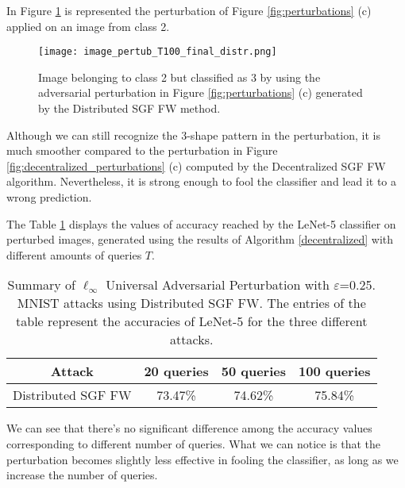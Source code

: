 In Figure \ref{fig:distributed} is represented the perturbation of Figure \ref{fig:perturbations} (c) applied on an image from class 2.

\begin{figure}[htbp]
	\centering
	\texttt{[image: image\_pertub\_T100\_final\_distr.png]}
	\caption{{\small Image belonging to class 2 but classified as 3 by using the adversarial perturbation in Figure \ref{fig:perturbations} (c) generated by the Distributed SGF FW method.}}
	\label{fig:distributed}
\end{figure}
Although we can still recognize the 3-shape pattern in the
perturbation, it is much smoother compared to the perturbation in Figure \ref{fig:decentralized_perturbations} (c) computed by the Decentralized
SGF FW algorithm. Nevertheless, it is strong enough to fool the classifier and lead it to a wrong prediction.

The Table \ref{tab:distributed} displays the values of accuracy reached by the LeNet-5 classifier on perturbed images, generated using the results of Algorithm \ref{decentralized} with different amounts of queries $T$.\\
\begin{table}[htbp]
	\begin{center}
		\begin{adjustwidth}{-.6cm}{}
			\begin{tabular}{c|ccc}
				\textbf{Attack} &          20 \textbf{queries} &      50 \textbf{queries} &     100 \textbf{queries} \\
				\midrule
				{\small Distributed SGF FW}     &   73.47\% &    74.62\% &       75.84\% \\
			\end{tabular}
		\end{adjustwidth}
	\end{center}
	\caption{{\small Summary of $\ell_\infty$ Universal Adversarial Perturbation with $\varepsilon$=0.25. MNIST attacks using Distributed SGF FW. The entries of the table represent the accuracies of LeNet-5 for the three different attacks.}}
	\label{tab:distributed}
\end{table}

We can see that there's no significant
difference among the accuracy values corresponding to different number of queries. What we can notice is that the
perturbation becomes slightly less effective in fooling the classifier, as long as we increase the number of queries.